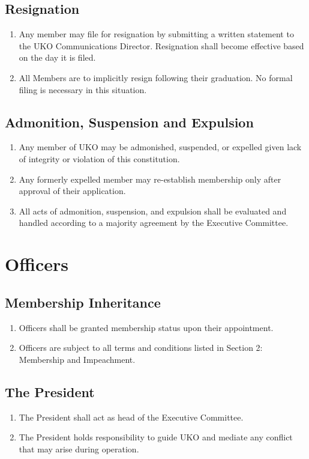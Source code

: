 \documentclass[12pt,executivepaper]{article}
\begin{document}
\subsection{Resignation}
\begin{enumerate}
    \item Any member may file for resignation by submitting a written statement to
          the UKO Communications Director. Resignation shall become effective based
          on the day it is filed.
    \item All Members are to implicitly resign following their graduation. No
          formal filing is necessary in this situation.
\end{enumerate}

\subsection{Admonition, Suspension and Expulsion}
\begin{enumerate}
    \item Any member of UKO may be admonished, suspended, or expelled given lack of
          integrity or violation of this constitution.
    \item Any formerly expelled member may re-establish membership only after
          approval of their application.
    \item All acts of admonition, suspension, and expulsion shall be evaluated
          and handled according to a majority agreement by the Executive
          Committee.
\end{enumerate}

\section{Officers}

\subsection{Membership Inheritance}
\begin{enumerate}
    \item Officers shall be granted membership status upon their appointment.
    \item Officers are subject to all terms and conditions listed in Section 2:
          Membership and Impeachment.
\end{enumerate}

\subsection{The President}
\begin{enumerate}
    \item The President shall act as head of the Executive Committee.
    \item The President holds responsibility to guide UKO and mediate any conflict
          that may arise during operation.
\end{enumerate}
\end{document}

